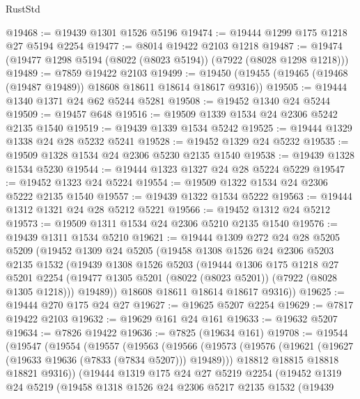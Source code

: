 \begin{lexlean}{RustStd}
\begin{coremodule}
@19468 := @19439 @1301 @1526 @5196
@19474 := @19444 @1299 @175 @1218 @27 @5194 @2254
@19477 := @8014 @19422 @2103 @1218
@19487 := @19474 (@19477 @1298 @5194 (@8022 (@8023 @5194)) (@7922 (@8028 @1298 @1218)))
@19489 := @7859 @19422 @2103
@19499 := @19450 (@19455 (@19465 (@19468 (@19487 @19489)) @18608 @18611 @18614 @18617 @9316))
@19505 := @19444 @1340 @1371 @24 @62 @5244 @5281
@19508 := @19452 @1340 @24 @5244
@19509 := @19457 @648
@19516 := @19509 @1339 @1534 @24 @2306 @5242 @2135 @1540
@19519 := @19439 @1339 @1534 @5242
@19525 := @19444 @1329 @1338 @24 @28 @5232 @5241
@19528 := @19452 @1329 @24 @5232
@19535 := @19509 @1328 @1534 @24 @2306 @5230 @2135 @1540
@19538 := @19439 @1328 @1534 @5230
@19544 := @19444 @1323 @1327 @24 @28 @5224 @5229
@19547 := @19452 @1323 @24 @5224
@19554 := @19509 @1322 @1534 @24 @2306 @5222 @2135 @1540
@19557 := @19439 @1322 @1534 @5222
@19563 := @19444 @1312 @1321 @24 @28 @5212 @5221
@19566 := @19452 @1312 @24 @5212
@19573 := @19509 @1311 @1534 @24 @2306 @5210 @2135 @1540
@19576 := @19439 @1311 @1534 @5210
@19621 := @19444
    @1309
    @272
    @24
    @28
    @5205
    @5209
    (@19452
      @1309
      @24
      @5205
      (@19458
        @1308
        @1526
        @24
        @2306
        @5203
        @2135
        @1532
        (@19439
          @1308
          @1526
          @5203
          (@19444
            @1306
            @175
            @1218
            @27
            @5201
            @2254
            (@19477 @1305 @5201 (@8022 (@8023 @5201)) (@7922 (@8028 @1305 @1218)))
            @19489))
        @18608
        @18611
        @18614
        @18617
        @9316))
@19625 := @19444 @270 @175 @24 @27
@19627 := @19625 @5207 @2254
@19629 := @7817 @19422 @2103
@19632 := @19629 @161 @24 @161
@19633 := @19632 @5207
@19634 := @7826 @19422
@19636 := @7825 (@19634 @161)
@19708 := @19544
    (@19547
      (@19554
        (@19557
          (@19563
            (@19566
              (@19573
                (@19576 (@19621 (@19627 (@19633 @19636 (@7833 (@7834 @5207))) @19489)))
                @18812
                @18815
                @18818
                @18821
                @9316))
            (@19444
              @1319
              @175
              @24
              @27
              @5219
              @2254
              (@19452
                @1319
                @24
                @5219
                (@19458
                  @1318
                  @1526
                  @24
                  @2306
                  @5217
                  @2135
                  @1532
                  (@19439

\end{coremodule}
\end{lexlean}
